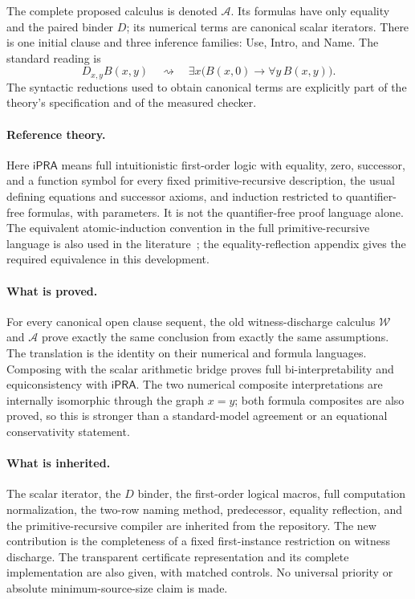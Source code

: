 \documentclass[11pt,a4paper]{article}
\theoremstyle{definition}\newtheorem{definition}[theorem]{Definition}
\theoremstyle{remark}\newtheorem{remark}[theorem]{Remark}
\newcommand{\ipra}{\mathsf{iPRA}}
\begin{document}
The complete proposed calculus is denoted $\mathcal A$.
Its formulas have only equality and the paired binder $D$; its numerical
terms are canonical scalar iterators. There is one initial clause and
three inference families: Use, Intro, and Name. The standard reading is
\[
  D_{x,y}B(x,y)
    \quad\rightsquigarrow\quad
  \exists x\bigl(B(x,0)\to\forall y\,B(x,y)\bigr).
\]
The syntactic reductions used to obtain canonical terms are explicitly
part of the theory's specification and of the measured checker.

\paragraph{Reference theory.}
Here $\ipra$ means full intuitionistic first-order logic with equality,
zero, successor, and a function symbol for every fixed primitive-recursive
description, the usual defining equations and successor axioms, and
induction restricted to quantifier-free formulas, with parameters.
It is not the quantifier-free proof language alone. The equivalent
atomic-induction convention in the full primitive-recursive language is
also used in the literature~\cite{khaniki}; the equality-reflection
appendix gives the required equivalence in this development.

\paragraph{What is proved.}
For every canonical open clause sequent, the old witness-discharge
calculus $\mathcal W$ and $\mathcal A$ prove exactly the same conclusion
from exactly the same assumptions. The translation is the identity on
their numerical and formula languages. Composing with the scalar
arithmetic bridge proves full bi-interpretability and equiconsistency
with $\ipra$. The two numerical composite interpretations are internally
isomorphic through the graph $x=y$; both formula composites are also
proved, so this is stronger than a standard-model agreement or an
equational conservativity statement.

\paragraph{What is inherited.}
The scalar iterator, the $D$ binder, the first-order logical macros,
full computation normalization, the two-row naming method, predecessor,
equality reflection, and the primitive-recursive compiler are inherited
from the repository. The new contribution is the completeness of a
fixed first-instance restriction on witness discharge. The transparent
certificate representation and its complete implementation are also
given, with matched controls. No universal priority or absolute
minimum-source-size claim is made.
\end{document}
